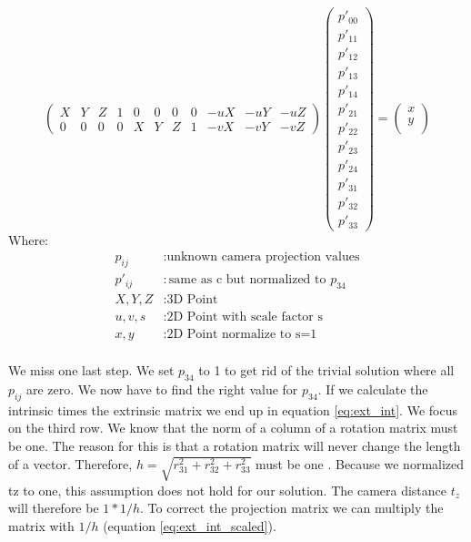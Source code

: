 \documentclass[11pt,a4paper,titlepage,oneside]{report}
\begin{document}
\begin{equation}\label{eq:projection_flat_red}
	\begin{pmatrix}
		X & Y & Z & 1 & 0 & 0 & 0 & 0 & -uX & -uY & -uZ\\
		0 & 0 & 0 & 0 & X & Y & Z & 1 & -vX & -vY & -vZ
	\end{pmatrix}
	\begin{pmatrix}
		p'_{00}\\
		p'_{11}\\
		p'_{12}\\
		p'_{13}\\
		p'_{14}\\
		p'_{21}\\
		p'_{22}\\
		p'_{23}\\
		p'_{24}\\
		p'_{31}\\
		p'_{32}\\
		p'_{33}
	\end{pmatrix}=
	\begin{pmatrix}x\\
		y\\
	\end{pmatrix}
\end{equation}
Where:
\begin{align*}
	p_{ij}		&: \text{unknown camera projection values}\\
	p'_{ij}		&: \text{same as c but normalized to $p_{34}$}\\
	X,Y,Z			&: \text{3D Point}\\
	u,v,s			&: \text{2D Point with scale factor s}\\
	x,y				&: \text{2D Point normalize to s=1}\\
\end{align*}

We miss one last step. We set $p_{34}$ to 1 to get rid of the trivial solution where all $p_{ij}$ are zero. We now have to find the right value for $p_{34}$. If we calculate the intrinsic times the extrinsic matrix we end up in equation \ref{eq:ext_int}. We focus on the third row. We know that the norm of a column of a rotation matrix must be one. The reason for this is that a rotation matrix will never change the length of a vector. Therefore, $h=\sqrt{r_{31}^2+r_{32}^2+r_{33}^2}$ must be one \cite{Wu}. Because we normalized tz to one, this assumption does not hold for our solution. The camera distance $t_z$ will therefore be $1*1/h$. To correct the projection matrix we can multiply the matrix with $1/h$ (equation \ref{eq:ext_int_scaled}).
\end{document}
